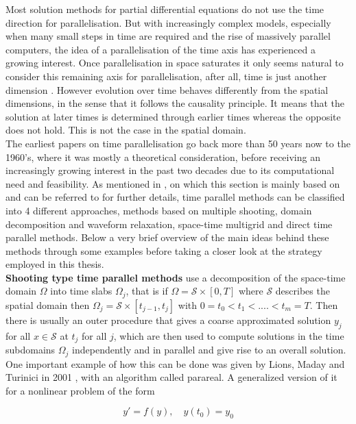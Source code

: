 \documentclass[../draft_1.tex]{subfiles}
\begin{document}
Most solution methods for partial differential equations  do not use the time direction for parallelisation. But with increasingly complex models, especially when many small steps in time are required and the rise of massively parallel computers, the idea of a parallelisation of the time axis has experienced a growing interest. Once parallelisation in space saturates it only seems natural to consider this remaining axis for parallelisation, after all, time is just another dimension \cite{gander201550}. However evolution over time behaves differently from the spatial dimensions, in the sense that it follows the causality principle. It means that the solution at later times is determined through earlier times whereas the opposite does not hold. This is not the case in the spatial domain. 
\smallskip
\\ 
The earliest papers on time parallelisation go back more than 50 years now to the 1960's, where it was mostly a theoretical consideration, before receiving an increasingly growing interest in the past two decades due to its computational need and feasibility. As mentioned in \cite{gander201550}, on which this section is mainly based on and can be referred to for further details, time parallel methods can be classified into 4 different approaches, methods based on multiple shooting, domain decomposition and waveform relaxation, space-time multigrid and direct time parallel methods. Below a very brief overview of the main ideas behind these methods through some examples before taking a closer look at the strategy employed in this thesis. 
\smallskip
\\
\textbf{Shooting type time parallel methods} use a decomposition of the space-time domain $\Omega$ into time slabs $\Omega_j$, that is if $\Omega = \mathcal{S} \times [0, T]$  where $\mathcal{S}$ describes the spatial domain then $ \Omega_j =  \mathcal{S} \times [t_{j-1}, t_j]$ with $0 = t_0 < t_1 < .... < t_m = T$. Then there is usually an outer procedure that gives a coarse approximated solution $y_j$ for all $ x \in \mathcal{S}$ at $t_j$ for all $j$, which are then used to compute solutions in the time subdomains $\Omega_j$ independently and in parallel and give rise to an overall solution. One important example of how this can be done was given by Lions, Maday and Turinici in 2001 \cite{lions2001resolutionions2001resolution}, with an algorithm called parareal. A generalized version of it for a nonlinear problem of the form
\begin{ceqn}
	\begin{equation}
	y' = f(y), \quad y(t_0) = y_0
	\end{equation}
\end{ceqn}
\end{document}
